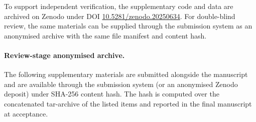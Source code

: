 \documentclass[manuscript]{acmart}
\begin{document}
To support independent verification, the supplementary code and data are archived
on Zenodo under DOI \href{https://doi.org/10.5281/zenodo.20250634}{10.5281/zenodo.20250634}.
For double-blind review, the same materials can be supplied through the
submission system as an anonymised archive with the same file manifest and
content hash.

\paragraph{Review-stage anonymised archive.} The following supplementary materials are submitted alongside the manuscript and are available through the submission system (or an anonymised Zenodo deposit) under SHA-256 content hash. The hash is computed over the concatenated tar-archive of the listed items and reported in the final manuscript at acceptance.
\end{document}
